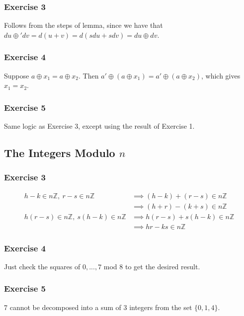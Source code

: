 \subsubsection{Exercise 3}
Follows from the steps of lemma, since we have that $du \oplus' dv = d(u + v) = d(sdu + sdv) = du \oplus dv$.

\subsubsection{Exercise 4}
Suppose $a \oplus x_1 = a \oplus x_2$. Then $a' \oplus (a \oplus x_1) = a' \oplus (a \oplus x_2)$,
which gives $x_1 = x_2$.

\subsubsection{Exercise 5}
Same logic as Exercise 3, except using the result of Exercise 1.

\subsection{The Integers Modulo $n$}

\subsubsection{Exercise 3}
\begin{align*}
        h - k \in n\mathbb{Z},\:  r - s \in n\mathbb{Z} &\implies (h - k) + (r - s) \in n\mathbb{Z} \\
                                                     &\implies (h + r) - (k + s) \in n\mathbb{Z} \\
        h (r - s) \in n\mathbb{Z},\: s (h - k) \in n\mathbb{Z} &\implies h (r - s) + s (h - k) \in n\mathbb{Z} \\
                                                               &\implies hr - ks \in n\mathbb{Z}
\end{align*}

\subsubsection{Exercise 4}
Just check the squares of $0, ..., 7$ mod 8 to get the desired result.

\subsubsection{Exercise 5}
7 cannot be decomposed into a sum of 3 integers from the set $\{0, 1, 4\}$.

